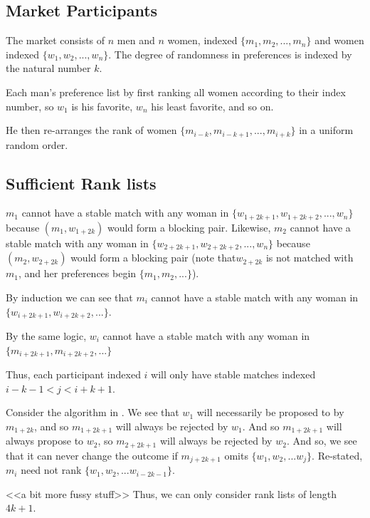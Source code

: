 \documentclass[WP]{AEA}
\begin{document}
\subsection{Market Participants}
The market consists of $n$ men and $n$ women,  indexed $\{ m_1, m_2, ... ,m_n\}$ and women indexed $\{ w_1, w_2, ... ,w_n\}$. The degree of randomness in preferences is indexed by the natural number $k$.

Each man's preference list by first ranking all women according to their index number, so $w_1$ is his favorite, $w_n$ his least favorite, and so on.  

He then re-arranges the rank of women $\{m_{i-k},m_{i-k+1}, ..., m_{i+k} \}$ in a uniform random order.

\subsection{Sufficient Rank lists}

$m_1$ cannot have a stable match with any woman in $\{w_{1+2k+1},w_{1+2k+2}, ...,w_n\}$ because $(m_1,w_{1+2k})$ would form a blocking pair. Likewise, $m_2$ cannot have a stable match with any woman in $\{w_{2+2k+1},w_{2+2k+2}, ...,w_n\}$ because $(m_2,w_{2+2k})$ would form a blocking pair (note that$w_{2+2k}$ is not matched with $m_1$, and her preferences begin $\{m_1,m_2,...\} $).

By induction we can see that $m_i$ cannot have a stable match with any woman in $\{w_{i+2k+1},w_{i+2k+2}, ...\}$.

By the same logic, $w_i$ cannot have a stable match with any woman in $\{m_{i+2k+1},m_{i+2k+2}, ...\}$

Thus, each participant indexed $i$ will only have stable matches indexed $i-k-1 < j < i+k+1$.

Consider the algorithm in \cite{Immorlica2005}. We see that $w_1$ will necessarily be proposed to by $m_{1+2k}$, and so  $m_{1+2k+1}$ will always be rejected by $w_1$. And so $m_{1+2k+1}$ will always propose to $w_2$,  so $m_{2+2k+1}$ will always be rejected by $w_2$.  And so, we see that it can never change the outcome if $m_{j+2k+1}$ omits $\{w_1,w_2,...w_j\}$. Re-stated, $m_i$ need not rank $\{w_1,w_2,...w_{i-2k-1}\}$.

<<a bit more fussy stuff>> 
Thus, we can only consider rank lists of length $4k+1$.
\end{document}
